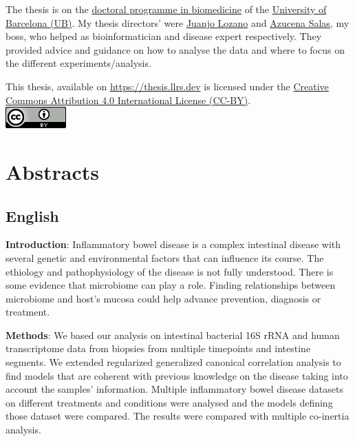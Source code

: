 \documentclass[
  12pt,
  a4paper,
  twoside,
  openright]{book}
\begin{document}
The thesis is on the \href{https://www.ub.edu/doctorat_biomedicina/eng/index.htm}{doctoral programme in biomedicine} of the \href{https://www.ub.edu/web/portal/en/}{University of Barcelona (UB)}.
My thesis directors' were \href{https://orcid.org/0000-0001-7613-3908}{Juanjo Lozano} and \href{https://orcid.org/0000-0003-4572-2907}{Azucena Salas}, my boss, who helped as bioinformatician and disease expert respectively.
They provided advice and guidance on how to analyse the data and where to focus on the different experiments/analysis.

This thesis, available on \url{https://thesis.llrs.dev} is licensed under the \href{https://creativecommons.org/licenses/by/4.0/}{Creative Commons Attribution 4.0 International License (CC-BY)}.\\
\includegraphics{images/by.png}

\hypertarget{abstracts}{%
\chapter*{Abstracts}\label{abstracts}}

\hypertarget{english}{%
\section*{English}\label{english}}

\textbf{Introduction}: Inflammatory bowel disease is a complex intestinal disease with several genetic and environmental factors that can influence its course.
The ethiology and pathophysiology of the disease is not fully understood.
There is some evidence that microbiome can play a role.
Finding relationships between microbiome and host's mucosa could help advance prevention, diagnosis or treatment.

\textbf{Methods}: We based our analysis on intestinal bacterial 16S rRNA and human transcriptome data from biopsies from multiple timepoints and intestine segments.
We extended regularized generalized canonical correlation analysis to find models that are coherent with previous knowledge on the disease taking into account the samples' information.
Multiple inflammatory bowel disease datasets on different treatments and conditions were analysed and the models defining those dataset were compared.
The results were compared with multiple co-inertia analysis.
\end{document}
